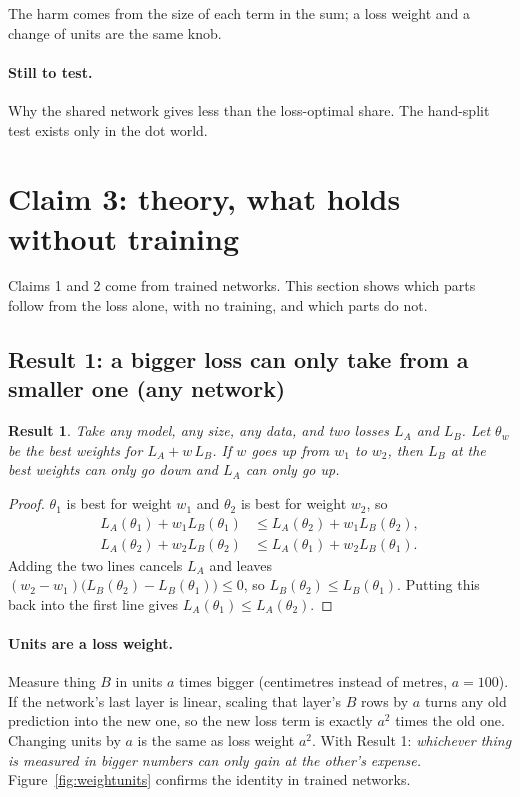 \documentclass[11pt]{article}
\newtheorem{theorem}{Result}
\newcommand{\para}[1]{\paragraph{#1}}
\begin{document}
\begin{takeaway}
The harm comes from the size of each term in the sum; a loss weight and a change of units are the same knob.
\end{takeaway}

\para{Still to test.} Why the shared network gives less than the loss-optimal share. The hand-split test exists only in the dot world.

\section{Claim 3: theory, what holds without training}
\label{sec:theory}

Claims 1 and 2 come from trained networks. This section shows which parts follow from the loss alone, with no training, and which parts do not.

\subsection{Result 1: a bigger loss can only take from a smaller one (any network)}

\begin{theorem}
Take any model, any size, any data, and two losses $L_A$ and $L_B$. Let $\theta_w$ be the best weights for $L_A + w\,L_B$. If $w$ goes up from $w_1$ to $w_2$, then $L_B$ at the best weights can only go down and $L_A$ can only go up.
\end{theorem}

\begin{proof}
$\theta_1$ is best for weight $w_1$ and $\theta_2$ is best for weight $w_2$, so
\begin{align*}
L_A(\theta_1) + w_1 L_B(\theta_1) &\le L_A(\theta_2) + w_1 L_B(\theta_2),\\
L_A(\theta_2) + w_2 L_B(\theta_2) &\le L_A(\theta_1) + w_2 L_B(\theta_1).
\end{align*}
Adding the two lines cancels $L_A$ and leaves $(w_2-w_1)\big(L_B(\theta_2)-L_B(\theta_1)\big)\le 0$, so $L_B(\theta_2)\le L_B(\theta_1)$. Putting this back into the first line gives $L_A(\theta_1)\le L_A(\theta_2)$.
\end{proof}

\para{Units are a loss weight.} Measure thing $B$ in units $a$ times bigger (centimetres instead of metres, $a=100$). If the network's last layer is linear, scaling that layer's $B$ rows by $a$ turns any old prediction into the new one, so the new loss term is exactly $a^2$ times the old one. Changing units by $a$ is the same as loss weight $a^2$. With Result 1: \emph{whichever thing is measured in bigger numbers can only gain at the other's expense.} Figure~\ref{fig:weightunits} confirms the identity in trained networks.
\end{document}
